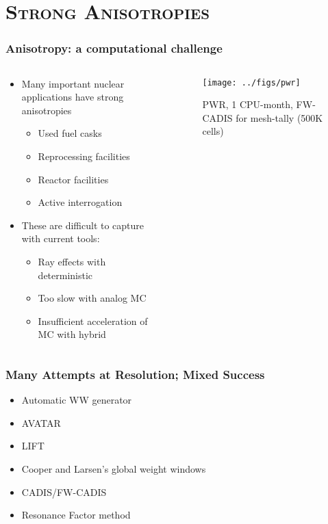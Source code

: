 \documentclass[xcolor=x11names,compress]{beamer}
\renewcommand{\(}{\begin{columns}}
\renewcommand{\)}{\end{columns}}
\newcommand{\<}[1]{\begin{column}{#1}}
\renewcommand{\>}{\end{column}}
\begin{document}
\section{\scshape Strong Anisotropies}
\begin{frame}[fragile]
  \frametitle{Anisotropy: a computational challenge}

	\begin{columns}
  	\begin{column}{0.5\textwidth}
	\begin{itemize}
	\item Many important nuclear applications have strong anisotropies
	 \begin{itemize}
	 \item Used fuel casks
	 \item Reprocessing facilities
	 \item Reactor facilities
	 \item Active interrogation 
	 \end{itemize}
	\item These are difficult to capture with current tools:
	 \begin{itemize}
	 \item Ray effects with deterministic
	 \item Too slow with analog MC
	 \item Insufficient acceleration of MC with hybrid
	 \end{itemize}
	\end{itemize}
  	\end{column}
 	\begin{column}{0.5\textwidth}
 	 \begin{center}
 	 \begin{figure}
 	 \texttt{[image: ../figs/pwr]}  
 	 \caption{PWR, 1 CPU-month, FW-CADIS  for mesh-tally (500K cells)}
 	 \end{figure}
 	 \end{center}

  	\end{column}
	\end{columns}

\end{frame}

\begin{frame}[fragile]
  \frametitle{Many Attempts at Resolution; Mixed Success}

	\begin{itemize}
	\item Automatic WW generator
	\item AVATAR
	\item LIFT
	\item Cooper and Larsen's global weight windows
	\item CADIS/FW-CADIS
	\item Resonance Factor method
	\end{itemize}

\end{frame}
\end{document}
